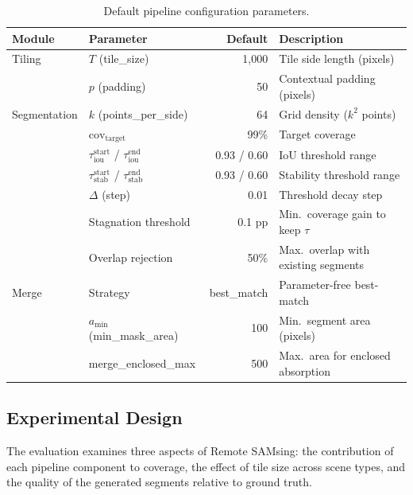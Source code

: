 \documentclass[review,11pt,authoryear]{elsarticle}
\begin{document}
\begin{table}[htbp]
\centering
\caption{Default pipeline configuration parameters.}
\label{tab:default_config}
\begin{tabular}{llrl}
\toprule
Module & Parameter & Default & Description \\
\midrule
Tiling & $T$ (tile\_size) & 1{,}000 & Tile side length (pixels) \\
       & $p$ (padding) & 50 & Contextual padding (pixels) \\
\midrule
Segmentation & $k$ (points\_per\_side) & 64 & Grid density ($k^2$ points) \\
             & $\text{cov}_{\text{target}}$ & 99\% & Target coverage \\
             & $\tau_{\text{iou}}^{\text{start}}$ / $\tau_{\text{iou}}^{\text{end}}$ & 0.93 / 0.60 & IoU threshold range \\
             & $\tau_{\text{stab}}^{\text{start}}$ / $\tau_{\text{stab}}^{\text{end}}$ & 0.93 / 0.60 & Stability threshold range \\
             & $\Delta$ (step) & 0.01 & Threshold decay step \\
             & Stagnation threshold & 0.1 pp & Min.\ coverage gain to keep $\tau$ \\
             & Overlap rejection & 50\% & Max.\ overlap with existing segments \\
\midrule
Merge & Strategy & best\_match & Parameter-free best-match \\
      & $a_{\min}$ (min\_mask\_area) & 100 & Min.\ segment area (pixels) \\
      & merge\_enclosed\_max & 500 & Max.\ area for enclosed absorption \\
\bottomrule
\end{tabular}
\end{table}

\subsection{Experimental Design}
\label{sec:exp_design}

The evaluation examines three aspects of Remote SAMsing: the contribution of each pipeline component to coverage, the effect of tile size across scene types, and the quality of the generated segments relative to ground truth.
\end{document}
